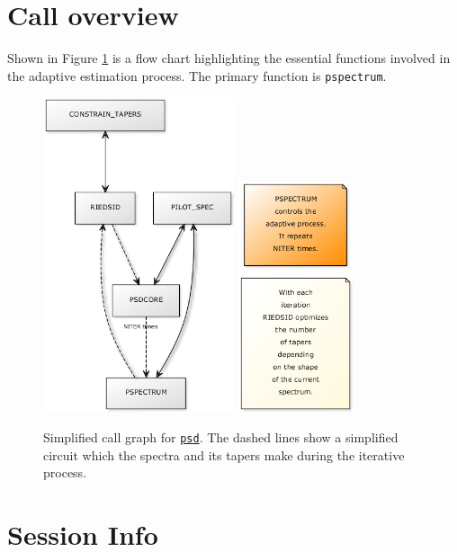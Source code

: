 \documentclass[10pt]{article}\usepackage[]{graphicx}\usepackage[]{color}
\newcommand{\Rcmd}[1]{\texttt{#1}}
\newcommand{\psd}[0]{\href{http://www.github.com/abarbour/psd/}{\color{blue}\Rcmd{psd}}}
\begin{document}

\section{Call overview}

Shown in Figure \ref{fig:calls} is a flow chart highlighting the essential
functions involved in the adaptive estimation process. The primary function is \Rcmd{pspectrum}.

\begin{figure}[!htbp]
 \centering
 \includegraphics[width=0.5\textwidth]{yuml_d.png}%
 \includegraphics[width=0.3\textwidth]{yuml_n.png}
 \caption{Simplified call graph for \psd{}. The dashed lines show a
 simplified circuit
 which the spectra and its tapers make during the iterative process.}
 \label{fig:calls}
\end{figure}

\clearpage

\section*{Session Info}


\clearpage



\end{document}

